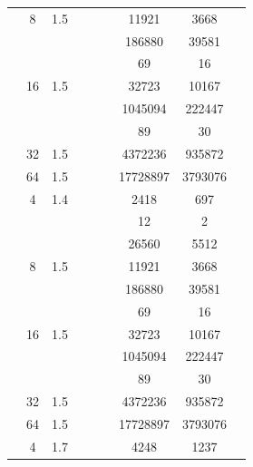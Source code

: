 \begin{table}[htbp]
\begin{tabular}{l S[table-format=3.0] S[table-format=4.1] l S[table-format=6.0] S[table-format=6.0] S[table-format=6.0] S[table-format=5.0] S[table-format=2.0]}
     & 8 & 1.5 &  & {\text{---}} & {\text{---}} & 11921 & 3668 & {\text{---}} \\
     &  &  &  & {\text{---}} & {\text{---}} & 186880 & 39581 & {\text{---}} \\
     &  &  &  & {\text{---}} & {\text{---}} & 69 & 16 & {\text{---}} \\
     & 16 & 1.5 &  & {\text{---}} & {\text{---}} & 32723 & 10167 & {\text{---}} \\
     &  &  &  & {\text{---}} & {\text{---}} & 1045094 & 222447 & {\text{---}} \\
     &  &  &  & {\text{---}} & {\text{---}} & 89 & 30 & {\text{---}} \\
     & 32 & 1.5 &  & {\text{---}} & {\text{---}} & 4372236 & 935872 & {\text{---}} \\
     & 64 & 1.5 &  & {\text{---}} & {\text{---}} & 17728897 & 3793076 & {\text{---}} \\
    \midrule
     & 4 & 1.4 &  & {\text{---}} & {\text{---}} & 2418 & 697 & {\text{---}} \\
     &  &  &  & {\text{---}} & {\text{---}} & 12 & 2 & {\text{---}} \\
     &  &  &  & {\text{---}} & {\text{---}} & 26560 & 5512 & {\text{---}} \\
     & 8 & 1.5 &  & {\text{---}} & {\text{---}} & 11921 & 3668 & {\text{---}} \\
     &  &  &  & {\text{---}} & {\text{---}} & 186880 & 39581 & {\text{---}} \\
     &  &  &  & {\text{---}} & {\text{---}} & 69 & 16 & {\text{---}} \\
     & 16 & 1.5 &  & {\text{---}} & {\text{---}} & 32723 & 10167 & {\text{---}} \\
     &  &  &  & {\text{---}} & {\text{---}} & 1045094 & 222447 & {\text{---}} \\
     &  &  &  & {\text{---}} & {\text{---}} & 89 & 30 & {\text{---}} \\
     & 32 & 1.5 &  & {\text{---}} & {\text{---}} & 4372236 & 935872 & {\text{---}} \\
     & 64 & 1.5 &  & {\text{---}} & {\text{---}} & 17728897 & 3793076 & {\text{---}} \\
    \midrule
     & 4 & 1.7 &  & {\text{---}} & {\text{---}} & 4248 & 1237 & {\text{---}} \\

\end{tabular}
\end{table}
